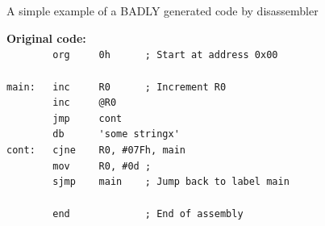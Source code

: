 \documentclass[a4paper,twoside,12pt]{book}
\newcommand{\mysmallfont}{\fontsize{8pt}{10pt} \selectfont{}}
\begin{document}
	\bigskip
	\noindent
	\begin{center}
		\small{A simple example of a BADLY generated code by disassembler}
	\end{center}
	\begin{minipage}{\textwidth}
		\twocolumn
		\begin{minipage}[t]{.6\textwidth}
			\mysmallfont{}
			\textbf{Original code:}\\
			\verb'        '{\color{highlight_directive}\verb'org'}\verb'     '{\color{highlight_hex}\verb'0h'}\verb'      '{\color{highlight_comment}\verb'; Start at address 0x00'}\\
			\verb''\\
			{\color{highlight_label}\verb'main:'}\verb'   '{\color{highlight_instruction}\verb'inc'}\verb'     '{\color{highlight_sfr}\verb'R0'}\verb'      '{\color{highlight_comment}\verb'; Increment R0'}\\
			\verb'        '{\color{highlight_instruction}\verb'inc'}\verb'     '{\color{highlight_indirect}\verb'@R0'}\\
			\verb'        '{\color{highlight_instruction}\verb'jmp'}\verb'     '{\color{highlight_constant}\verb'cont'}\\
			\verb'        '{\color{highlight_directive}\verb'db'}\verb'      '{\color{highlight_string}\verb''\verb"'"\verb'some stringx'\verb"'"\verb''}\\
			{\color{highlight_label}\verb'cont:'}\verb'   '{\color{highlight_instruction}\verb'cjne'}\verb'    '{\color{highlight_sfr}\verb'R0'}{\color{highlight_oper_sep}\verb','}\verb' '{\color{highlight_imm_hex}\verb'#07Fh'}{\color{highlight_oper_sep}\verb','}\verb' '{\color{highlight_constant}\verb'main'}\\
			\verb'        '{\color{highlight_instruction}\verb'mov'}\verb'     '{\color{highlight_sfr}\verb'R0'}{\color{highlight_oper_sep}\verb','}\verb' '{\color{highlight_imm_dec}\verb'#0d'}\verb' '{\color{highlight_comment}\verb';'}\\
			\verb'        '{\color{highlight_instruction}\verb'sjmp'}\verb'    '{\color{highlight_constant}\verb'main'}\verb'    '{\color{highlight_comment}\verb'; Jump back to label main'}\\
			\verb''\\
			\verb'        '{\color{highlight_directive}\verb'end'}\verb'             '{\color{highlight_comment}\verb'; End of assembly'}\\
		\end{minipage}\begin{minipage}[t]{.4\textwidth}

\end{minipage}
\end{minipage}
\end{document}
